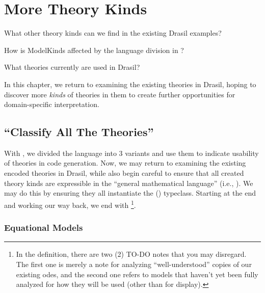 \chapter{More Theory Kinds}
\label{chap:more-theory-kinds}

\begin{writingdirectives}
	\item What other theory kinds can we find in the existing Drasil examples?
	\item How is ModelKinds affected by the language division in
	?
	\item What theories currently are used in Drasil?
\end{writingdirectives}

In this chapter, we return to examining the existing theories in Drasil, hoping
to discover more \textit{kinds} of theories in them to create further
opportunities for domain-specific interpretation.

\section{\textquotedblleft{}Classify All The Theories\textquotedblright{}}
\label{chap:more-theory-kinds:sec:classify-all-the-theories}

With , we divided the \Expr{} language into 3 variants
and use them to indicate usability of theories in code generation. Now, we may
return to examining the existing encoded theories in Drasil, while also begin
careful to ensure that all created theory kinds are expressible in the ``general
mathematical language'' (i.e., \ModelExpr{}). We may do this by ensuring they
all instantiate the \Express{} () typeclass. Starting
at the end and working our way back, we end with
\footnote{In the 
	definition, there are two (2) TO-DO notes that you may disregard. The first one
	is merely a note for analyzing ``well-understood'' copies of our existing
	\acsp{ode}, and the second one refers to models that haven't yet been fully
	analyzed for how they will be used (other than for display).}.

\currentModelKindsHaskell{}

\subsection{Equational Models}
\label{chap:more-theory-kinds:sec:classify-all-the-theories:subsec:equational-models}

